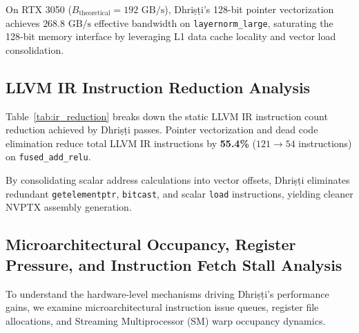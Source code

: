 \documentclass[10pt,journal,compsoc]{IEEEtran}
\begin{document}
On RTX 3050 ($B_{\text{theoretical}} = 192\text{ GB/s}$), Dhri\d{s}\d{t}i's 128-bit pointer vectorization achieves $268.8\text{ GB/s}$ effective bandwidth on \texttt{layernorm\_large}, saturating the 128-bit memory interface by leveraging L1 data cache locality and vector load consolidation.

\subsection{LLVM IR Instruction Reduction Analysis}
Table~\ref{tab:ir_reduction} breaks down the static LLVM IR instruction count reduction achieved by Dhri\d{s}\d{t}i passes. Pointer vectorization and dead code elimination reduce total LLVM IR instructions by \textbf{55.4\%} ($121 \rightarrow 54$ instructions) on \texttt{fused\_add\_relu}.

\begin{table}[htbp]
\centering
\caption{LLVM IR Instruction Count Reduction Achieved by Dhri\d{s}\d{t}i Hardware-Aware Optimization Passes.}
\label{tab:ir_reduction}
\end{table}

By consolidating scalar address calculations into vector offsets, Dhri\d{s}\d{t}i eliminates redundant \texttt{getelementptr}, \texttt{bitcast}, and scalar \texttt{load} instructions, yielding cleaner NVPTX assembly generation.

\subsection{Microarchitectural Occupancy, Register Pressure, and Instruction Fetch Stall Analysis}
To understand the hardware-level mechanisms driving Dhri\d{s}\d{t}i's performance gains, we examine microarchitectural instruction issue queues, register file allocations, and Streaming Multiprocessor (SM) warp occupancy dynamics.
\end{document}

